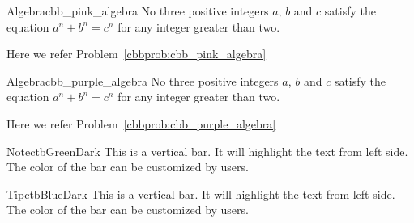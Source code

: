 \documentclass[11pt, letterpaper]{../exercise}
\begin{document}
    \begin{cbbpinkproblem}{Algebra}{cbb_pink_algebra}
    No three positive integers \(a\), \(b\) and \(c\) satisfy the equation
    \(a^{n} + b^{n} = c^{n}\) for any integer greater than two.
    \end{cbbpinkproblem}
    Here we refer Problem~\ref{cbbprob:cbb_pink_algebra}

    \begin{cbbpurpleproblem}{Algebra}{cbb_purple_algebra}
    No three positive integers \(a\), \(b\) and \(c\) satisfy the equation
    \(a^{n} + b^{n} = c^{n}\) for any integer greater than two.
    \end{cbbpurpleproblem}
    Here we refer Problem~\ref{cbbprob:cbb_purple_algebra}

    \begin{cbbar}{Note}{ctbGreenDark}
        This is a vertical bar.
        It will highlight the text from left side.
        The color of the bar can be customized by users.
    \end{cbbar}

    \begin{cbbar}{Tip}{ctbBlueDark}
        This is a vertical bar.
        It will highlight the text from left side.
        The color of the bar can be customized by users.
    \end{cbbar}

\end{document}
